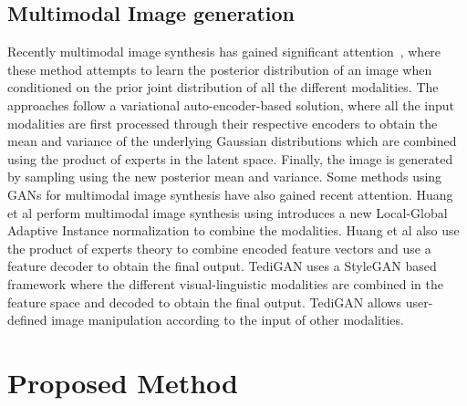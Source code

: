 \documentclass[10pt,twocolumn,letterpaper]{article}
\begin{document}
\subsection{Multimodal Image generation}
Recently multimodal image synthesis has gained significant attention~\cite{huang2021multimodal,shi2019variational,sutter2021generalized,suzuki2016joint,wu2018multimodal,xia2021tedigan,zhang2021m6}, where these method attempts to learn the posterior distribution of an image when conditioned on the prior joint distribution of all the different modalities. The approaches \cite{shi2019variational,suzuki2016joint,wu2018multimodal,zhang2021m6,sutter2021generalized} follow a variational auto-encoder-based solution, where all the input modalities are first processed through their respective encoders to obtain the mean and variance of the underlying Gaussian distributions which are combined using the product of experts in the latent space. Finally, the image is generated by sampling using the new posterior mean and variance. Some methods using GANs for multimodal image synthesis have also gained recent attention. Huang et al\cite{huang2021multimodal} perform multimodal image synthesis using introduces a new Local-Global Adaptive Instance normalization to combine the modalities. Huang et al \cite{huang2021multimodal} also use the product of experts theory to combine encoded feature vectors and use a feature decoder to obtain the final output. TediGAN\cite{xia2021tedigan} uses a StyleGAN \cite{karras2019style} based framework where the different visual-linguistic modalities are combined in the feature space and decoded to obtain the final output. TediGAN allows user-defined image manipulation according to the input of other modalities.



















\section{Proposed Method}
\end{document}
